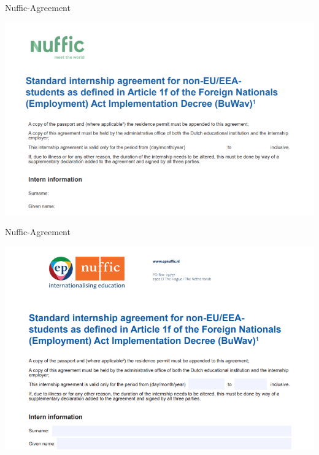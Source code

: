 \documentclass[12pt, aspectratio=43]{beamer}
\begin{document}
\begin{frame}{Nuffic-Agreement}
\begin{center}
    \includegraphics[scale=0.5]{images/NufficStd.png}
\end{center}
\end{frame}

\begin{frame}{Nuffic-Agreement}
\begin{center}
    \includegraphics[scale=0.5]{images/NufficAnother.png}
\end{center}
\end{frame}
\end{document}
